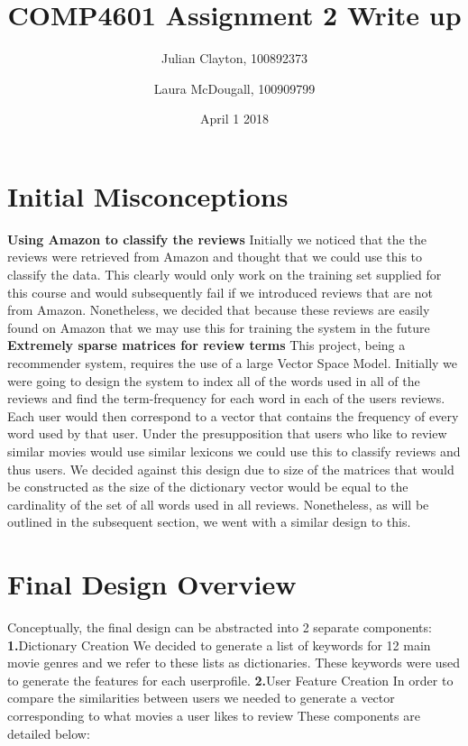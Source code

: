 \documentclass{article}
\title{COMP4601 Assignment 2 Write up}
\author{Julian Clayton, 100892373 \and  Laura McDougall, 100909799}
\date{April 1 2018}
\begin{document}
\maketitle

\section{Initial Misconceptions}
\textbf{Using Amazon to classify the reviews}\newline
Initially we noticed that the the reviews were retrieved from Amazon and thought that we could use this to classify the data. This clearly would only work on the training set supplied for this course and would subsequently fail if we introduced reviews that are not from Amazon. Nonetheless, we decided that because these reviews are easily found on Amazon that  we may use this for training the system in the future \newline\newline
\textbf{Extremely sparse matrices for review terms}\newline
This project, being a recommender system, requires the use of a large Vector Space Model. Initially we were going to design the system to index all of the words used in all of the reviews and find the term-frequency for each word in each of the users reviews.  Each user would then correspond to a vector that contains the frequency of every word used by that user. Under the presupposition that users who like to review similar movies would use similar lexicons we could use this to classify reviews and thus users. We decided against this design due to size of the matrices that would be constructed as the size of the dictionary vector would be equal to the cardinality of the set of all words used in all reviews. Nonetheless, as will be outlined in the subsequent section, we went with a similar design to this. 
\section{Final Design Overview}
Conceptually, the final  design can be abstracted into 2 separate components: \newline\newline
\textbf{1.}\space Dictionary Creation\newline
We decided to generate a list of keywords for 12 main movie genres and we refer to these lists as dictionaries. These keywords were used to generate the features for each userprofile.\newline 
\textbf{2.}\space User Feature Creation\newline
In order to compare the similarities between users we needed to generate a vector corresponding to what movies a user likes to review \newline\newline
These components are detailed below:
\end{document}
